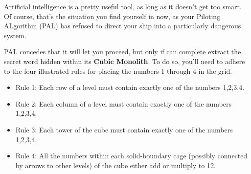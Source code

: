 Artificial intelligence is a pretty useful tool, as long as it doesn't
get too smart. Of course, that's the situation you find yourself in now,
as your Piloting ALgorithm (PAL) has refused to direct your ship 
into a particularly dangerous system.

PAL concedes that it will let you proceed, but only if can complete
extract the secret word hidden within its \textbf{Cubic Monolith}.
To do so, you'll need to adhere to the four illustrated rules for
placing the numbers \(1\) through \(4\) in the grid.

\begin{itemize}
\item Rule 1: Each row of a level must contain exactly one
  of the numbers 1,2,3,4.
\item Rule 2: Each column of a level must contain exactly one
  of the numbers 1,2,3,4.
\item Rule 3: Each tower of the cube must contain exactly one
  of the numbers 1,2,3,4.
\item Rule 4: All the numbers within each solid-boundary cage
  (possibly connected by arrows to other levels) of the cube 
  either add or multiply to 12.
\end{itemize}

